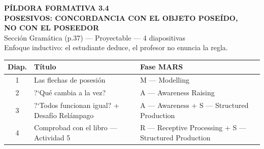 \documentclass[a4paper,10pt]{article}
\renewcommand{\arraystretch}{1.3}
\begin{document}

\begin{center}
{\LARGE\textbf{\textcolor{purpura}{P\'ILDORA FORMATIVA 3.4}}}\\[0.3cm]
{\Large\textbf{POSESIVOS: CONCORDANCIA CON EL OBJETO POSE\'IDO,}}\\[0.1cm]
{\Large\textbf{NO CON EL POSEEDOR}}\\[0.3cm]
{\normalsize Secci\'on Gram\'atica (p.37) --- Proyectable --- 4 diapositivas}\\[0.1cm]
{\small Enfoque inductivo: el estudiante deduce, el profesor no enuncia la regla.}
\end{center}

\vspace{0.5cm}


\begin{tcolorbox}[colback=gris, colframe=purpura, title={\textbf{Resumen de diapositivas}}, fonttitle=\bfseries\color{white}, colbacktitle=purpura, arc=3pt]
\renewcommand{\arraystretch}{1.5}
\begin{tabular}{c >{\raggedright\arraybackslash}p{5.5cm} >{\raggedright\arraybackslash}p{6.5cm}}
\textbf{Diap.} & \textbf{T\'itulo} & \textbf{Fase MARS} \\
\midrule
1 & Las flechas de posesi\'on & M --- Modelling \\
2 & ?`Qu\'e cambia a la vez? & A --- Awareness Raising \\
3 & ?`Todos funcionan igual? + Desaf\'io Rel\'ampago & A --- Awareness + S --- Structured Production \\
4 & Comprobad con el libro --- Actividad 5 & R --- Receptive Processing + S --- Structured Production \\
\end{tabular}
\end{tcolorbox}

\vspace{0.5cm}

\end{document}
